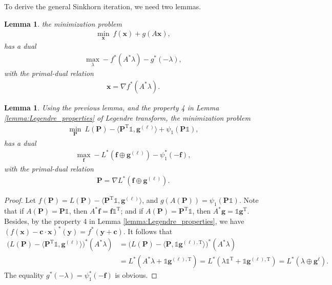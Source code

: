 \documentclass[11pt]{book}
\newtheorem{lemma}[theorem]{Lemma}
\begin{document}
To derive the general Sinkhorn iteration, we need two lemmas.
\begin{lemma}
    the minimization problem
    \begin{align*}
        \min_{\mathbf{x}} \ f(\mathbf{x}) + g(A\mathbf{x}),
    \end{align*}
    has a dual
    \begin{align*}
        \max_{\lambda} -f^*(A^{*}\lambda) - g^*(-\lambda),
    \end{align*}
    with the primal-dual relation
    \begin{align*}
        \mathbf{x} = \nabla f^*(A^{*}\lambda).
    \end{align*}
\end{lemma}
\begin{lemma}
    Using the previous lemma, and the property 4 in Lemma \ref{lemma:Legendre_properties} of Legendre transform, the minimization problem
    \begin{align*}
        \min_{\mathbf{P}} \ L(\mathbf{P}) - \langle \mathbf{P}^{\mathrm{T}}\mathbb{1}, \mathbf{g}^{(\ell)} \rangle + \psi_1(\mathbf{P}\mathbb{1}),
    \end{align*}
    has a dual
    \begin{align*}
        \max_{\mathbf{f}} -L^*(\mathbf{f}\oplus\mathbf{g}^{(\ell)}) - \psi_1^*(-\mathbf{f}),
    \end{align*}
    with the primal-dual relation
    \begin{align*}
        \mathbf{P} = \nabla L^*(\mathbf{f}\oplus\mathbf{g}^{(\ell)}).
    \end{align*}
\end{lemma}
\begin{proof}
    Let $f(\mathbf{P}) = L(\mathbf{P}) - \langle \mathbf{P}^{\mathrm{T}}\mathbb{1}, \mathbf{g}^{(\ell)} \rangle $, and $g(A(\mathbf{P})) = \psi_1(\mathbf{P}\mathbb{1})$. Note that if $A(\mathbf{P}) = \mathbf{P}\mathbb{1}$, then $A^*\mathbf{f} = \mathbf{f}\mathbb{1}^{\mathrm{T}}$; and if $A(\mathbf{P}) = \mathbf{P}^{\mathrm{T}}\mathbb{1}$, then $A^*\mathbf{g} = \mathbb{1}\mathbf{g}^{\mathrm{T}}$. Besides, by the property 4 in Lemma \ref{lemma:Legendre_properties}, we have $(f(\mathbf{x})-\mathbf{c}\cdot\mathbf{x})^*(\mathbf{y}) = f^*(\mathbf{y}+\mathbf{c})$. It follows that
    \begin{align*}
        \big(L(\mathbf{P}) - \langle \mathbf{P}^{\mathrm{T}}\mathbb{1}, \mathbf{g}^{(\ell)} \rangle \big)^*(A^*\lambda) &= 
        \big(L(\mathbf{P}) - \langle \mathbf{P}, \mathbb{1}\mathbf{g}^{(\ell),\mathrm{T}} \rangle \big)^*(A^*\lambda) \\
        &= L^*(A^*\lambda + \mathbb{1}\mathbf{g}^{(\ell),\mathrm{T}}) 
        = L^*(\lambda\mathbb{1}^{\mathrm{T}} + \mathbb{1}\mathbf{g}^{(\ell),\mathrm{T}})
        = L^*( \lambda \oplus \mathbf{g}^{\ell} ).
    \end{align*}
    The equality $g^*(-\lambda) = \psi_1^*(-\mathbf{f})$ is obvious.   
\end{proof}
\end{document}
